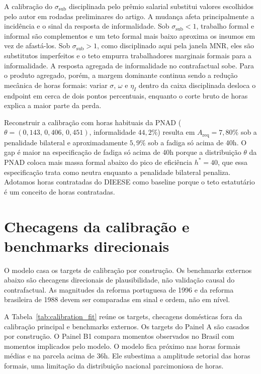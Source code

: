\documentclass[10pt,twocolumn]{article}
\begin{document}
A calibra\c{c}\~ao do $\sigma_{\text{sub}}$ disciplinada pelo pr\^emio salarial substitui valores escolhidos pelo autor em rodadas preliminares do artigo. A mudan\c{c}a afeta principalmente a incid\^encia e o sinal da resposta de informalidade. Sob $\sigma_{\text{sub}}<1$, trabalho formal e informal s\~ao complementos e um teto formal mais baixo aproxima os insumos em vez de afast\'a-los. Sob $\sigma_{\text{sub}}>1$, como disciplinado aqui pela janela MNR, eles s\~ao substitutos imperfeitos e o teto empurra trabalhadores marginais formais para a informalidade. A resposta agregada de informalidade no contrafactual sobe. Para o produto agregado, por\'em, a margem dominante continua sendo a redu\c{c}\~ao mec\^anica de horas formais: variar $\sigma$, $\omega$ e $\eta_I$ dentro da caixa disciplinada desloca o endpoint em cerca de dois pontos percentuais, enquanto o corte bruto de horas explica a maior parte da perda.

Reconstruir a calibra\c{c}\~ao com horas habituais da PNAD ($\theta=(0{,}143,\,0{,}406,\,0{,}451)$, informalidade $44{,}2\%$) resulta em $A_{\text{req}}=7{,}80\%$ sob a penalidade bilateral e aproximadamente $5{,}9\%$ sob a fadiga s\'o acima de 40h. O gap \'e maior na especifica\c{c}\~ao de fadiga s\'o acima de 40h porque a distribui\c{c}\~ao $\theta$ da PNAD coloca mais massa formal abaixo do pico de efici\^encia $h^*=40$, que essa especifica\c{c}\~ao trata como neutra enquanto a penalidade bilateral penaliza. Adotamos horas contratadas do DIEESE como baseline porque o teto estatut\'ario \'e um conceito de horas contratadas.

\section{Checagens da calibra\c{c}\~ao e benchmarks direcionais}\label{sec:validation}

O modelo casa os targets de calibra\c{c}\~ao por constru\c{c}\~ao. Os benchmarks externos abaixo s\~ao checagens direcionais de plausibilidade, n\~ao valida\c{c}\~ao causal do contrafactual. As magnitudes da reforma portuguesa de 1996 e da reforma brasileira de 1988 devem ser comparadas em sinal e ordem, n\~ao em n\'ivel.

A Tabela~\ref{tab:calibration_fit} re\'une os targets, checagens dom\'esticas fora da calibra\c{c}\~ao principal e benchmarks externos. Os targets do Painel A s\~ao casados por constru\c{c}\~ao. O Painel B1 compara momentos observados no Brasil com momentos implicados pelo modelo. O modelo fica pr\'oximo nas horas formais m\'edias e na parcela acima de $36$h. Ele subestima a amplitude setorial das horas formais, uma limita\c{c}\~ao da distribui\c{c}\~ao nacional parcimoniosa de horas.
\end{document}
